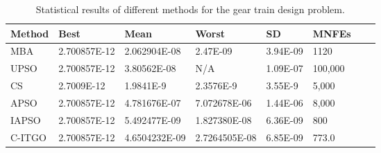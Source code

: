 
\begin{table*}[tp]
    \tiny
\begin{center}

\begin{tabular}{ P{2.0cm} P{2.0cm} P{2.0cm} P{2.0cm} P{2.0cm} P{2.0cm} P{2.0cm} P{2.0cm}  }
\hline
\textbf{Method} & \textbf{Best} & \textbf{Mean} & \textbf{Worst} & \textbf{SD} & \textbf{MNFEs} \\
\hline

MBA & 2.700857E-12 & 2.062904E-08 & 2.47E-09 & 3.94E-09 & 1120 \\
UPSO & 2.700857E-12 & 3.80562E-08 & N/A & 1.09E-07 & 100,000 \\
CS & 2.7009E-12 & 1.9841E-9 & 2.3576E-9 & 3.55E-9 & 5,000 \\
APSO & 2.700857E-12 & 4.781676E-07 & 7.072678E-06 & 1.44E-06 & 8,000 \\
IAPSO & 2.700857E-12 & 5.492477E-09 & 1.827380E-08 & 6.36E-09 & 800 \\
C-ITGO & 2.700857E-12 & 4.6504232E-09 & 2.7264505E-08 & 6.85E-09 & 773.0 \\


\hline
\end{tabular}
\end{center}

\caption{ Statistical results of different methods for the gear train design problem. \\[1em]}
\label{tab:GT}
\end{table*}

